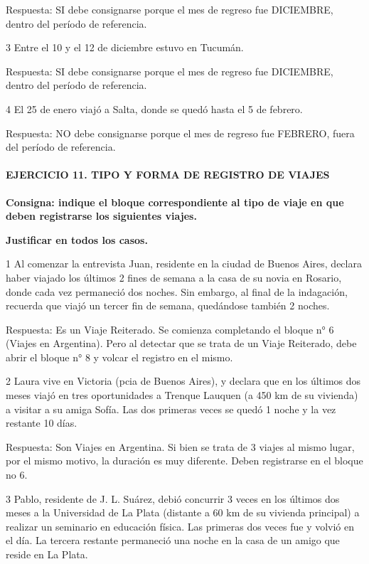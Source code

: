 \documentclass[
  openany]{book}
\begin{document}
Respuesta: SI debe consignarse porque el mes de regreso fue DICIEMBRE, dentro del período de referencia.

3 Entre el 10 y el 12 de diciembre estuvo en Tucumán.

Respuesta: SI debe consignarse porque el mes de regreso fue DICIEMBRE, dentro del período de referencia.

4 El 25 de enero viajó a Salta, donde se quedó hasta el 5 de febrero.

Respuesta: NO debe consignarse porque el mes de regreso fue FEBRERO, fuera del período de referencia.

\hypertarget{ejercicio-11.-tipo-y-forma-de-registro-de-viajes-1}{%
\paragraph{\texorpdfstring{\textbf{EJERCICIO 11. TIPO Y FORMA DE REGISTRO DE VIAJES}}{EJERCICIO 11. TIPO Y FORMA DE REGISTRO DE VIAJES}}\label{ejercicio-11.-tipo-y-forma-de-registro-de-viajes-1}}

\textbf{Consigna: indique el bloque correspondiente al tipo de viaje en que deben registrarse los siguientes viajes.}

\textbf{Justificar en todos los casos.}

1 Al comenzar la entrevista Juan, residente en la ciudad de Buenos Aires, declara haber viajado los últimos 2 fines de semana a la casa de su novia en Rosario, donde cada vez permaneció dos noches. Sin embargo, al final de la indagación, recuerda que viajó un tercer fin de semana, quedándose también 2 noches.

Respuesta: Es un Viaje Reiterado. Se comienza completando el bloque n° 6 (Viajes en Argentina). Pero al detectar que se trata de un Viaje Reiterado, debe abrir el bloque n° 8 y volcar el registro en el mismo.

2 Laura vive en Victoria (pcia de Buenos Aires), y declara que en los últimos dos meses viajó en tres oportunidades a Trenque Lauquen (a 450 km de su vivienda) a visitar a su amiga Sofía. Las dos primeras veces se quedó 1 noche y la vez restante 10 días.

Respuesta: Son Viajes en Argentina. Si bien se trata de 3 viajes al mismo lugar, por el mismo motivo, la duración es muy diferente. Deben registrarse en el bloque no 6.

3 Pablo, residente de J. L. Suárez, debió concurrir 3 veces en los últimos dos meses a la Universidad de La Plata (distante a 60 km de su vivienda principal) a realizar un seminario en educación física. Las primeras dos veces fue y volvió en el día. La tercera restante permaneció una noche en la casa de un amigo que reside en La Plata.
\end{document}
